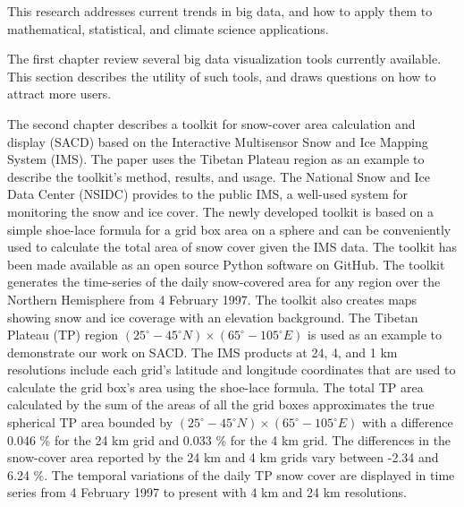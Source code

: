 

This research addresses current trends in big data, and how to apply them to mathematical, statistical, and climate science applications.

The first chapter review several big data visualization tools currently available. This section describes the utility of such tools, and draws questions on how to attract more users.

The second chapter describes a  toolkit for snow-cover area calculation and display (SACD) based on the Interactive Multisensor Snow and Ice Mapping System (IMS). The paper uses the Tibetan Plateau region as an example to describe the toolkit's method, results, and usage. 
The National Snow and Ice Data Center (NSIDC) provides to the public IMS, a well-used system for monitoring the snow and ice cover. The newly developed toolkit is based on a simple shoe-lace formula for a grid box area on a sphere and can be conveniently used to calculate the total area of snow cover given the IMS data. The toolkit has been made available as an open source Python software on GitHub. The toolkit generates the time-series of the daily snow-covered area for any region over the Northern Hemisphere from 4 February 1997. The toolkit also creates maps showing snow and ice coverage with an elevation background. The Tibetan Plateau (TP) region $(25^{\circ}-45^{\circ}N) \times (65^{\circ}-105^{\circ}E)$ is used as an example to demonstrate our work on SACD. The IMS products at 24, 4, and 1 km resolutions include each grid's latitude and longitude coordinates that are used to calculate the grid box's area using the shoe-lace formula. The total TP area calculated by the sum of the areas of all the grid boxes approximates the true spherical TP area bounded by $(25^{\circ}-45^{\circ}N) \times (65^{\circ}-105^{\circ}E)$ with a difference  0.046 \% for the 24 km grid and 0.033 \% for the 4 km grid.  The differences in the snow-cover area reported by the 24 km and 4 km grids vary between -2.34 and 6.24 \%. The temporal variations of the daily TP snow cover are displayed in time series from 4 February 1997 to present with 4 km and 24 km resolutions. 

